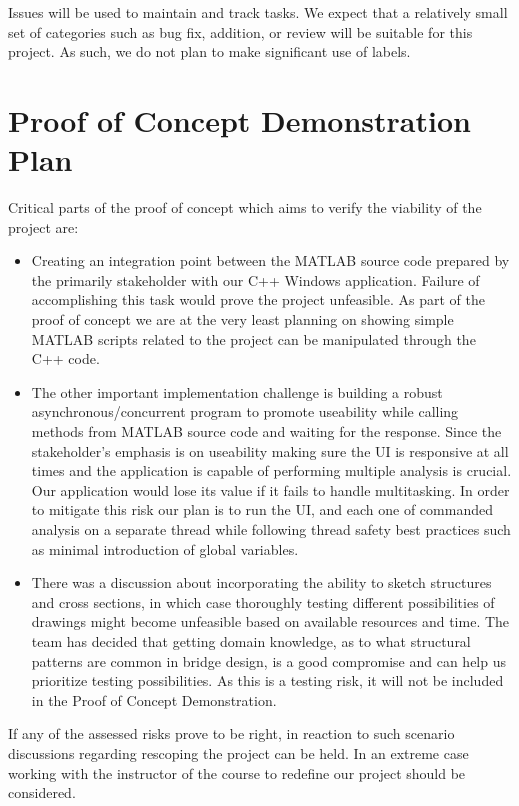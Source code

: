 \documentclass{article}
\begin{document}
Issues will be used to maintain and track tasks. We expect that a relatively small set of categories such as bug fix, addition, or review will be suitable for this project. As such, we do not plan to make significant use of labels.

\section{Proof of Concept Demonstration Plan}

Critical parts of the proof of concept which aims to verify the viability of the project are: \\
\begin{itemize}
\item Creating an integration point between the MATLAB source code prepared by the primarily stakeholder with our C++ Windows application. Failure of accomplishing this task would prove the project unfeasible. As part of the proof of concept we are at the very least planning on showing simple MATLAB scripts related to the project can be manipulated through the C++ code.
\item The other important implementation challenge is building a robust asynchronous/concurrent program to promote useability while calling methods from MATLAB source code and waiting for the response. Since the stakeholder's emphasis is on useability making sure the UI is responsive at all times and the application is capable of performing multiple analysis is crucial. Our application would lose its value if it fails to handle multitasking. In order to mitigate this risk our plan is to run the UI, and each one of commanded analysis on a separate thread while following thread safety best practices such as minimal introduction of global variables.
\item There was a discussion about incorporating the ability to sketch structures and cross sections, in which case thoroughly testing different possibilities of drawings might become unfeasible based on available resources and time. The team has decided that getting domain knowledge, as to what structural patterns are common in bridge design, is a good compromise and can help us prioritize testing possibilities. As this is a testing risk, it will not be included in the Proof of Concept Demonstration.

\end{itemize}
If any of the assessed risks prove to be right, in reaction to such scenario discussions regarding rescoping the project can be held. In an extreme case working with the instructor of the course to redefine our project should be considered.
\end{document}
